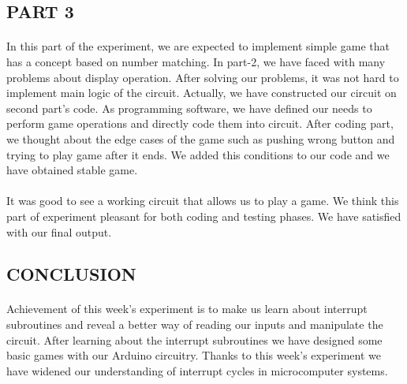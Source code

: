 \documentclass[pdftex,12pt,a4paper]{article}
\begin{document}
\begin{flushleft}
\subsection{PART 3}
\paragraph{}
In this part of the experiment, we are expected to implement simple game that has a concept based on number matching. In part-2, we have faced with many problems about display operation. After solving our problems, it was not hard to implement main logic of the circuit. Actually, we have constructed our circuit on second part's code. As programming software, we have defined our needs to perform game operations and directly code them into circuit. After coding part, we thought about the edge cases of the game such as pushing wrong button and trying to play game after it ends. We added this conditions to our code and we have obtained stable game.
\paragraph{}
It was good to see a working circuit that allows us to play a game. We think this part of experiment pleasant for both coding and testing phases. We have satisfied with our final output.
\end{flushleft}



\begin{flushleft}
\section{CONCLUSION}
\paragraph{}
Achievement of this week's experiment is to make us learn about interrupt subroutines and reveal a better way of reading our inputs and manipulate the circuit. After learning about the interrupt subroutines we have designed some basic games with our Arduino circuitry. Thanks to this week's experiment we have widened our understanding of interrupt cycles in microcomputer systems.

\end{flushleft}
\newpage
\nocite{*}
\begin{flushleft}




\end{flushleft}
\end{document}
